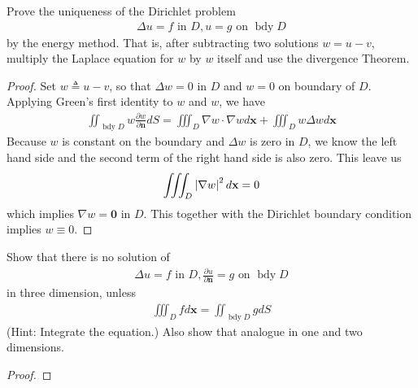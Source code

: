 \documentclass{report}
\begin{document}
\begin{question}{}{}
Prove the uniqueness of the Dirichlet problem 
\begin{align*}
\Delta u= f \text{ in }D,u=g\text{ on }\operatorname{bdy}D
\end{align*}
by the energy method. That is, after subtracting two solutions $w=u-v$, multiply the Laplace equation for  $w$ by $w$ itself and use the divergence Theorem. 
\end{question}
\begin{proof}
Set $w\triangleq u-v$, so that $\Delta w=0$ in $D$ and  $w=0$ on boundary of $D$. Applying Green's first identity to $w$ and  $w$, we have 
\begin{align*}
  \iint_{\operatorname{bdy}D} w \frac{\partial w}{\partial \textbf{n}}dS =\iiint_D \nabla w \cdot \nabla w d\textbf{x}+ \iiint_D w \Delta w d\textbf{x} 
\end{align*}
Because $w$ is constant on the boundary and $\Delta w$ is zero in $D$, we know the left hand side and the second term of the right hand side is also zero. This leave us 
 \begin{align*}
\iiint_D  \left|\nabla w\right|^2 d \textbf{x}=0 
\end{align*}
which implies $\nabla w=\textbf{0}$ in $D$.  This together with the Dirichlet boundary condition implies $w\equiv 0$.  
\end{proof}
\begin{question}{}{}
Show that there is no solution of 
\begin{align*}
\Delta u =f \text{ in }D, \frac{\partial u}{\partial \textbf{n}}=g\text{ on }\operatorname{bdy}D
\end{align*}
in three dimension, unless
\begin{align*}
\iiint_D fd\textbf{x}= \iint_{\operatorname{bdy}D}gdS
\end{align*}
(Hint: Integrate the equation.) Also show that analogue in one and two dimensions. 
\end{question}
\begin{proof}
\end{proof}
\end{document}
